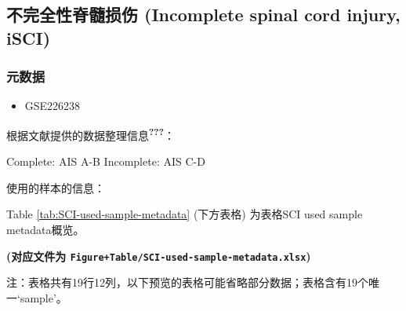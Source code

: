 \documentclass[
]{article}
\providecommand{\tightlist}{%
  \setlength{\itemsep}{0pt}\setlength{\parskip}{0pt}}
\begin{document}
\hypertarget{ux4e0dux5b8cux5168ux6027ux810aux9ad3ux635fux4f24-incomplete-spinal-cord-injury-isci}{%
\subsection{不完全性脊髓损伤 (Incomplete spinal cord injury, iSCI)}\label{ux4e0dux5b8cux5168ux6027ux810aux9ad3ux635fux4f24-incomplete-spinal-cord-injury-isci}}

\hypertarget{ux5143ux6570ux636e}{%
\subsubsection{元数据}\label{ux5143ux6570ux636e}}

\begin{itemize}
\tightlist
\item
  GSE226238
\end{itemize}

根据文献提供的数据整理信息\textsuperscript{{\textbf{???}}}：

Complete: AIS A-B
Incomplete: AIS C-D

使用的样本的信息：

Table \ref{tab:SCI-used-sample-metadata} (下方表格) 为表格SCI used sample metadata概览。

\textbf{(对应文件为 \texttt{Figure+Table/SCI-used-sample-metadata.xlsx})}

\begin{center}\begin{tcolorbox}[colback=gray!10, colframe=gray!50, width=0.9\linewidth, arc=1mm, boxrule=0.5pt]注：表格共有19行12列，以下预览的表格可能省略部分数据；表格含有19个唯一`sample'。
\end{tcolorbox}
\end{center}
\end{document}

